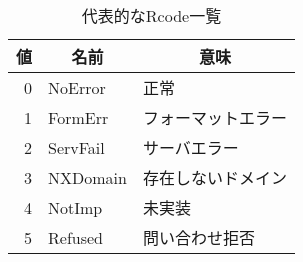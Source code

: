 \begin{table}[h]
 \caption{代表的なRcode一覧}
 \centering
  \begin{tabular}{rll}
    \toprule
		\multicolumn{1}{c}{\textbf{値}} & \multicolumn{1}{c}{\textbf{名前}} & \multicolumn{1}{c}{\textbf{意味}}\\
    \midrule
    0 & NoError & 正常\\
    1 & FormErr & フォーマットエラー\\
    2 & ServFail & サーバエラー\\
    3 & NXDomain & 存在しないドメイン\\
    4 & NotImp & 未実装\\
    5 & Refused & 問い合わせ拒否\\
    \bottomrule
  \end{tabular}
 \label{tab:dns-rcode}
\end{table}
